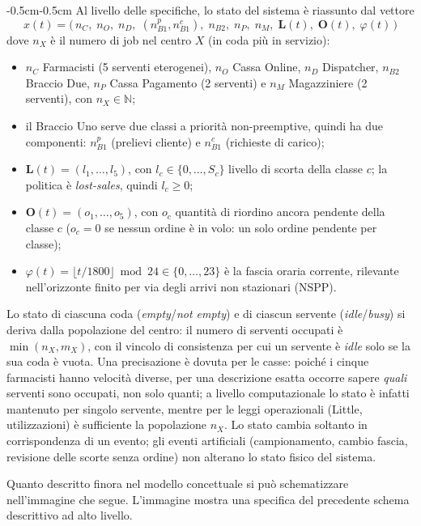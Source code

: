 \documentclass{article}
\begin{document}
\begin{adjustwidth}{-0.5cm}{-0.5cm}
Al livello delle specifiche, lo stato del sistema è riassunto dal vettore
\[
x(t) = \bigl(\, n_C,\; n_O,\; n_D,\; (n_{B1}^{p}, n_{B1}^{c}),\;
n_{B2},\; n_P,\; n_M,\; \mathbf{L}(t),\; \mathbf{O}(t),\; \varphi(t) \,\bigr)
\]
dove $n_X$ è il numero di job nel centro $X$ (in coda più in servizio):
\begin{itemize}
  \item $n_C$ Farmacisti (5 serventi eterogenei), $n_O$ Cassa Online, $n_D$ Dispatcher,
        $n_{B2}$ Braccio Due, $n_P$ Cassa Pagamento (2 serventi) e $n_M$ Magazziniere (2 serventi),
        con $n_X \in \mathbb{N}$;
  \item il Braccio Uno serve due classi a priorità non-preemptive, quindi ha due componenti:
        $n_{B1}^{p}$ (prelievi cliente) e $n_{B1}^{c}$ (richieste di carico);
  \item $\mathbf{L}(t)=(l_1,\dots,l_5)$, con $l_c \in \{0,\dots,S_c\}$ livello di scorta della classe
        $c$; la politica è \emph{lost-sales}, quindi $l_c \ge 0$;
  \item $\mathbf{O}(t)=(o_1,\dots,o_5)$, con $o_c$ quantità di riordino ancora pendente della classe
        $c$ ($o_c = 0$ se nessun ordine è in volo: un solo ordine pendente per classe);
  \item $\varphi(t)=\lfloor t/1800\rfloor \bmod 24 \in \{0,\dots,23\}$ è la fascia oraria corrente,
        rilevante nell'orizzonte finito per via degli arrivi non stazionari (NSPP).
\end{itemize}
Lo stato di ciascuna coda (\emph{empty}/\emph{not empty}) e di ciascun servente (\emph{idle}/\emph{busy})
si deriva dalla popolazione del centro: il numero di serventi occupati è $\min(n_X, m_X)$, con il
vincolo di consistenza per cui un servente è \emph{idle} solo se la sua coda è vuota. Una
precisazione è dovuta per le casse: poiché i cinque farmacisti hanno velocità diverse, per una
descrizione esatta occorre sapere \emph{quali} serventi sono occupati, non solo quanti; a livello
computazionale lo stato è infatti mantenuto per singolo servente, mentre per le leggi operazionali
(Little, utilizzazioni) è sufficiente la popolazione $n_X$. Lo stato cambia soltanto in
corrispondenza di un evento; gli eventi artificiali (campionamento, cambio fascia, revisione delle
scorte senza ordine) non alterano lo stato fisico del sistema.

Quanto descritto finora nel modello concettuale si può schematizzare nell'immagine che segue.
L'immagine mostra una specifica del precedente schema descrittivo ad alto livello.


\end{adjustwidth}
\end{document}

